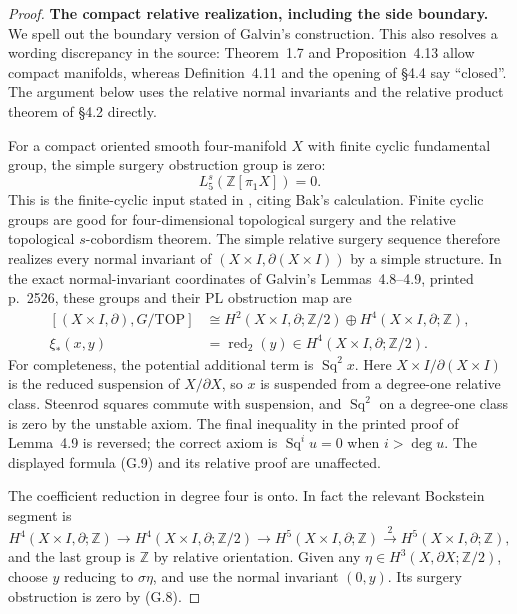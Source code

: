 \begin{proof}
\textbf{The compact relative realization, including the side boundary.}
We spell out the boundary version of Galvin's construction. This also
resolves a wording discrepancy in the source: Theorem~1.7 and
Proposition~4.13 allow compact manifolds, whereas Definition~4.11 and
the opening of \S4.4 say ``closed''. The argument below uses the relative
normal invariants and the relative product theorem of \S4.2 directly.

For a compact oriented smooth four-manifold $X$ with finite cyclic
fundamental group, the simple surgery obstruction group is zero:
\[
                 L^s_5(\mathbb Z[\pi_1X])=0.
                                                        \tag{G.8}
\]
This is the finite-cyclic input stated in
\cite[\S4.4, printed p.~2528]{Galvin2026}, citing Bak's calculation.
Finite cyclic groups are good for four-dimensional topological surgery
and the relative topological $s$-cobordism theorem. The simple relative
surgery sequence therefore realizes every normal invariant of
$(X\times I,\partial(X\times I))$ by a simple structure. In the exact
normal-invariant coordinates of Galvin's Lemmas~4.8--4.9, printed
p.~2526, these groups and their PL obstruction map are
\[
 \begin{split}
 [(X\times I,\partial),G/\mathrm{TOP}]&\cong
 H^2(X\times I,\partial;\mathbb Z/2)
       \oplus H^4(X\times I,\partial;\mathbb Z),\\
 \xi_*(x,y)&=\operatorname{red}_2(y)
       \in H^4(X\times I,\partial;\mathbb Z/2).
 \end{split}                                            \tag{G.9}
\]
For completeness, the potential additional term is $\operatorname{Sq}^2x$.
Here $X\times I/\partial(X\times I)$ is the reduced suspension of
$X/\partial X$, so $x$ is suspended from a degree-one relative class.
Steenrod squares commute with suspension, and $\operatorname{Sq}^2$ on
a degree-one class is zero by the unstable axiom. The final inequality
in the printed proof of Lemma~4.9 is reversed; the correct axiom is
$\operatorname{Sq}^i u=0$ when $i>\deg u$. The displayed formula (G.9)
and its relative proof are unaffected.

The coefficient reduction in degree four is onto. In fact the relevant
Bockstein segment is
\[
 H^4(X\times I,\partial;\mathbb Z)\longrightarrow
 H^4(X\times I,\partial;\mathbb Z/2)\longrightarrow
 H^5(X\times I,\partial;\mathbb Z)
       \xrightarrow{\;2\;}
 H^5(X\times I,\partial;\mathbb Z),
                                                        \tag{G.10}
\]
and the last group is $\mathbb Z$ by relative orientation. Given any
$\eta\in H^3(X,\partial X;\mathbb Z/2)$, choose $y$ reducing to
$\sigma\eta$, and use the normal invariant $(0,y)$. Its surgery
obstruction is zero by (G.8).


\end{proof}
